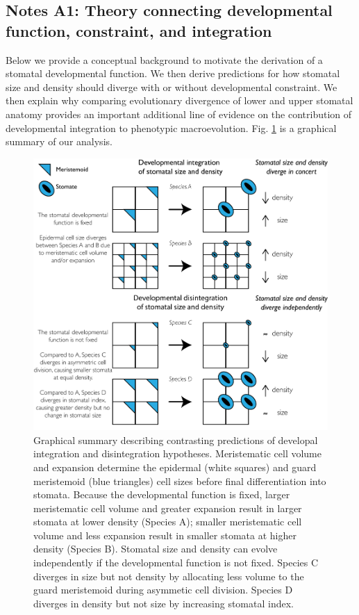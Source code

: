 \documentclass[
  12pt,
]{article}
\begin{document}
\clearpage

\hypertarget{notes-a1-theory-connecting-developmental-function-constraint-and-integration}{%
\subsection{Notes A1: Theory connecting developmental function, constraint, and integration}\label{notes-a1-theory-connecting-developmental-function-constraint-and-integration}}

Below we provide a conceptual background to motivate the derivation of a stomatal developmental function. We then derive predictions for how stomatal size and density should diverge with or without developmental constraint. We then explain why comparing evolutionary divergence of lower and upper stomatal anatomy provides an important additional line of evidence on the contribution of developmental integration to phenotypic macroevolution. Fig. \ref{fig:developmental-integration} is a graphical summary of our analysis.

\begin{figure}[ht]
\includegraphics[width=\textwidth]{../figures/developmental-integration.pdf}
\caption{Graphical summary describing contrasting predictions of developal integration and disintegration hypotheses. Meristematic cell volume and expansion determine the epidermal (white squares) and guard meristemoid (blue triangles) cell sizes before final differentiation into stomata. Because the developmental function is fixed, larger meristematic cell volume and greater expansion result in larger stomata at lower density (Species A); smaller meristematic cell volume and less expansion result in smaller stomata at higher density (Species B). Stomatal size and density can evolve independently if the developmental function is not fixed. Species C diverges in size but not density by allocating less volume to the guard meristemoid during asymmetic cell division. Species D diverges in density but not size by increasing stomatal index.}
\label{fig:developmental-integration}
\end{figure}
\end{document}
